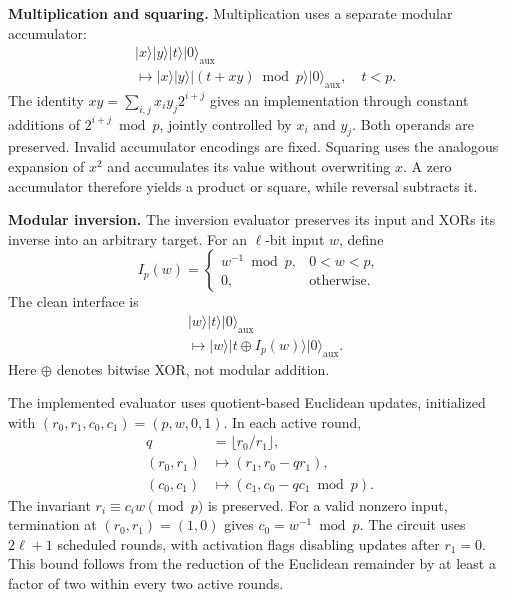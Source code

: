 \begin{revision}
\textbf{Multiplication and squaring.}
Multiplication uses a separate modular accumulator:
\begin{equation}
\label{eq:app_r5_multiply_accumulate}
\begin{aligned}
&\lvert x\rangle\lvert y\rangle\lvert t\rangle
 \lvert0\rangle_{\mathrm{aux}}\\
&\longmapsto
 \lvert x\rangle\lvert y\rangle
 \lvert(t+xy)\bmod p\rangle
 \lvert0\rangle_{\mathrm{aux}},\quad t<p.
\end{aligned}
\end{equation}
The identity $xy=\sum_{i,j}x_i y_j2^{i+j}$ gives an implementation
through constant additions of $2^{i+j}\bmod p$, jointly controlled by
$x_i$ and $y_j$. Both operands are preserved. Invalid accumulator
encodings are fixed. Squaring uses the analogous expansion of $x^2$
and accumulates its value without overwriting $x$. A zero accumulator
therefore yields a product or square, while reversal subtracts it.

\textbf{Modular inversion.}
The inversion evaluator preserves its input and XORs its inverse into
an arbitrary target. For an $\ell$-bit input $w$, define
\[
I_p(w)=
\begin{cases}
w^{-1}\bmod p,&0<w<p,\\
0,&\text{otherwise}.
\end{cases}
\]
The clean interface is
\begin{equation}
\label{eq:app_r5_inverse_evaluator}
\begin{aligned}
&\lvert w\rangle\lvert t\rangle
 \lvert0\rangle_{\mathrm{aux}}\\
&\longmapsto
 \lvert w\rangle\lvert t\oplus I_p(w)\rangle
 \lvert0\rangle_{\mathrm{aux}}.
\end{aligned}
\end{equation}
Here $\oplus$ denotes bitwise XOR, not modular addition.

The implemented evaluator uses quotient-based Euclidean updates,
initialized with $(r_0,r_1,c_0,c_1)=(p,w,0,1)$. In each active round,
\begin{equation}
\label{eq:app_r5_euclidean_update}
\begin{aligned}
q&=\lfloor r_0/r_1\rfloor,\\
(r_0,r_1)&\longmapsto(r_1,r_0-qr_1),\\
(c_0,c_1)&\longmapsto(c_1,c_0-qc_1\bmod p).
\end{aligned}
\end{equation}
The invariant $r_i\equiv c_iw\pmod p$ is preserved. For a valid
nonzero input, termination at $(r_0,r_1)=(1,0)$ gives
$c_0=w^{-1}\bmod p$. The circuit uses $2\ell+1$ scheduled rounds,
with activation flags disabling updates after $r_1=0$. This bound
follows from the reduction of the Euclidean remainder by at least
a factor of two within every two active rounds.


\end{revision}
